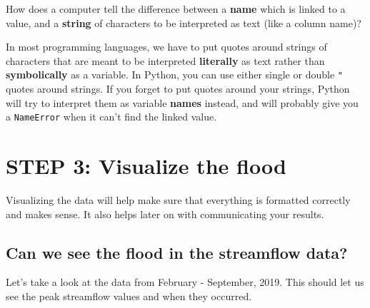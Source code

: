 \documentclass[
  letterpaper,
  DIV=11,
  numbers=noendperiod,
  oneside]{scrreprt}
\begin{document}
\begin{tcolorbox}[enhanced jigsaw, colbacktitle=quarto-callout-tip-color!10!white, opacityback=0, bottomtitle=1mm, toptitle=1mm, bottomrule=.15mm, left=2mm, colframe=quarto-callout-tip-color-frame, leftrule=.75mm, opacitybacktitle=0.6, colback=white, rightrule=.15mm, toprule=.15mm, breakable, titlerule=0mm, title=\textcolor{quarto-callout-tip-color}{\faLightbulb}\hspace{0.5em}{Strings}, coltitle=black, arc=.35mm]

How does a computer tell the difference between a \textbf{name} which is
linked to a value, and a \textbf{string} of characters to be interpreted
as text (like a column name)?

In most programming languages, we have to put quotes around strings of
characters that are meant to be interpreted \textbf{literally} as text
rather than \textbf{symbolically} as a variable. In Python, you can use
either single \texttt{\textquotesingle{}} or double \texttt{"} quotes
around strings. If you forget to put quotes around your strings, Python
will try to interpret them as variable \textbf{names} instead, and will
probably give you a \texttt{NameError} when it can't find the linked
value.

\end{tcolorbox}

\section{STEP 3: Visualize the flood}\label{step-3-visualize-the-flood}

Visualizing the data will help make sure that everything is formatted
correctly and makes sense. It also helps later on with communicating
your results.

\subsection{Can we see the flood in the streamflow
data?}\label{can-we-see-the-flood-in-the-streamflow-data}

Let's take a look at the data from February - September, 2019. This
should let us see the peak streamflow values and when they occurred.
\end{document}
